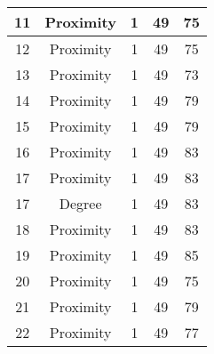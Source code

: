 \documentclass[results.tex]{subfiles}
\begin{document}
\begin{center}
\begin{tabular}{| c || c | c | c | c |}
            \hline
            11                      & Proximity                    & 1                      & 49                      & 75                   \\
            \hline
            12                      & Proximity                    & 1                      & 49                      & 75                   \\
            \hline
            13                      & Proximity                    & 1                      & 49                      & 73                   \\
            \hline
            14                      & Proximity                    & 1                      & 49                      & 79                   \\
            \hline
            15                      & Proximity                    & 1                      & 49                      & 79                   \\
            \hline
            16                      & Proximity                    & 1                      & 49                      & 83                   \\
            \hline
            17                      & Proximity                    & 1                      & 49                      & 83                   \\
            \hline
            17                      & Degree                       & 1                      & 49                      & 83                   \\
            \hline
            18                      & Proximity                    & 1                      & 49                      & 83                   \\
            \hline
            19                      & Proximity                    & 1                      & 49                      & 85                   \\
            \hline
            20                      & Proximity                    & 1                      & 49                      & 75                   \\
            \hline
            21                      & Proximity                    & 1                      & 49                      & 79                   \\
            \hline
            22                      & Proximity                    & 1                      & 49                      & 77                   \\

\end{tabular}
\end{center}
\end{document}
